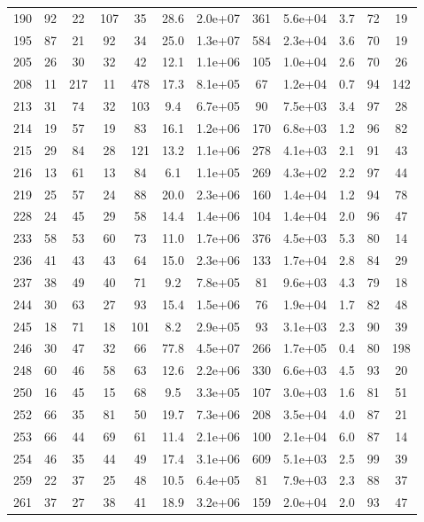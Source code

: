 \begin{table}
\begin{tabular}{cccccccccccc}
190 & 92 & 22 & 107 & 35 & 28.6 & 2.0e+07 & 361 & 5.6e+04 & 3.7 & 72 & 19 \\
195 & 87 & 21 & 92 & 34 & 25.0 & 1.3e+07 & 584 & 2.3e+04 & 3.6 & 70 & 19 \\
205 & 26 & 30 & 32 & 42 & 12.1 & 1.1e+06 & 105 & 1.0e+04 & 2.6 & 70 & 26 \\
208 & 11 & 217 & 11 & 478 & 17.3 & 8.1e+05 & 67 & 1.2e+04 & 0.7 & 94 & 142 \\
213 & 31 & 74 & 32 & 103 & 9.4 & 6.7e+05 & 90 & 7.5e+03 & 3.4 & 97 & 28 \\
214 & 19 & 57 & 19 & 83 & 16.1 & 1.2e+06 & 170 & 6.8e+03 & 1.2 & 96 & 82 \\
215 & 29 & 84 & 28 & 121 & 13.2 & 1.1e+06 & 278 & 4.1e+03 & 2.1 & 91 & 43 \\
216 & 13 & 61 & 13 & 84 & 6.1 & 1.1e+05 & 269 & 4.3e+02 & 2.2 & 97 & 44 \\
219 & 25 & 57 & 24 & 88 & 20.0 & 2.3e+06 & 160 & 1.4e+04 & 1.2 & 94 & 78 \\
228 & 24 & 45 & 29 & 58 & 14.4 & 1.4e+06 & 104 & 1.4e+04 & 2.0 & 96 & 47 \\
233 & 58 & 53 & 60 & 73 & 11.0 & 1.7e+06 & 376 & 4.5e+03 & 5.3 & 80 & 14 \\
236 & 41 & 43 & 43 & 64 & 15.0 & 2.3e+06 & 133 & 1.7e+04 & 2.8 & 84 & 29 \\
237 & 38 & 49 & 40 & 71 & 9.2 & 7.8e+05 & 81 & 9.6e+03 & 4.3 & 79 & 18 \\
244 & 30 & 63 & 27 & 93 & 15.4 & 1.5e+06 & 76 & 1.9e+04 & 1.7 & 82 & 48 \\
245 & 18 & 71 & 18 & 101 & 8.2 & 2.9e+05 & 93 & 3.1e+03 & 2.3 & 90 & 39 \\
246 & 30 & 47 & 32 & 66 & 77.8 & 4.5e+07 & 266 & 1.7e+05 & 0.4 & 80 & 198 \\
248 & 60 & 46 & 58 & 63 & 12.6 & 2.2e+06 & 330 & 6.6e+03 & 4.5 & 93 & 20 \\
250 & 16 & 45 & 15 & 68 & 9.5 & 3.3e+05 & 107 & 3.0e+03 & 1.6 & 81 & 51 \\
252 & 66 & 35 & 81 & 50 & 19.7 & 7.3e+06 & 208 & 3.5e+04 & 4.0 & 87 & 21 \\
253 & 66 & 44 & 69 & 61 & 11.4 & 2.1e+06 & 100 & 2.1e+04 & 6.0 & 87 & 14 \\
254 & 46 & 35 & 44 & 49 & 17.4 & 3.1e+06 & 609 & 5.1e+03 & 2.5 & 99 & 39 \\
259 & 22 & 37 & 25 & 48 & 10.5 & 6.4e+05 & 81 & 7.9e+03 & 2.3 & 88 & 37 \\
261 & 37 & 27 & 38 & 41 & 18.9 & 3.2e+06 & 159 & 2.0e+04 & 2.0 & 93 & 47 \\

\end{tabular}
\end{table}
